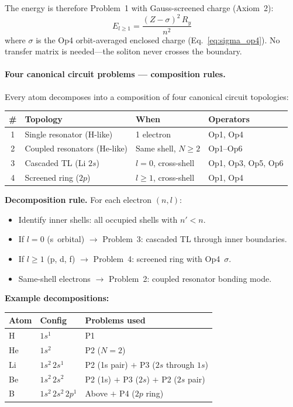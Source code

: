 The energy is therefore Problem~1 with
Gauss-screened charge (Axiom~2):
\begin{equation}
    E_{l \geq 1} = \frac{(Z - \sigma)^2\,R_y}{n^2}
    \label{eq:E_screened}
\end{equation}
where $\sigma$ is the Op4 orbit-averaged enclosed
charge (Eq.~\ref{eq:sigma_op4}).  No transfer
matrix is needed---the soliton never crosses the
boundary.

\paragraph{Four canonical circuit problems
--- composition rules.}

Every atom decomposes into a composition
of four canonical circuit topologies:

\begin{center}
\small
\renewcommand{\arraystretch}{1.3}
\begin{tabular}{clll}
\hline
\textbf{\#} & \textbf{Topology}
& \textbf{When} & \textbf{Operators} \\
\hline
1 & Single resonator (H-like)
& 1 electron & Op1, Op4 \\
2 & Coupled resonators (He-like)
& Same shell, $N \geq 2$ & Op1--Op6 \\
3 & Cascaded TL (Li $2s$)
& $l = 0$, cross-shell
& Op1, Op3, Op5, Op6 \\
4 & Screened ring ($2p$)
& $l \geq 1$, cross-shell & Op1, Op4 \\
\hline
\end{tabular}
\end{center}

\noindent\textbf{Decomposition rule.}
For each electron $(n, l)$:
\begin{itemize}
    \item Identify inner shells: all occupied
          shells with $n' < n$.
    \item If $l = 0$ (s~orbital) $\to$ Problem~3:
          cascaded TL through inner boundaries.
    \item If $l \geq 1$ (p, d, f) $\to$ Problem~4:
          screened ring with Op4~$\sigma$.
    \item Same-shell electrons $\to$ Problem~2:
          coupled resonator bonding mode.
\end{itemize}

\noindent\textbf{Example decompositions:}
\begin{center}
\small
\renewcommand{\arraystretch}{1.2}
\begin{tabular}{lll}
\hline
\textbf{Atom} & \textbf{Config}
& \textbf{Problems used} \\
\hline
H  & $1s^1$       & P1 \\
He & $1s^2$       & P2 ($N{=}2$) \\
Li & $1s^2\,2s^1$ & P2 (1s pair)
     $+$ P3 ($2s$ through $1s$) \\
Be & $1s^2\,2s^2$ & P2 (1s) $+$ P3 ($2s$)
     $+$ P2 ($2s$ pair) \\
B  & $1s^2\,2s^2\,2p^1$ & Above $+$ P4 ($2p$ ring) \\
\hline
\end{tabular}
\end{center}

